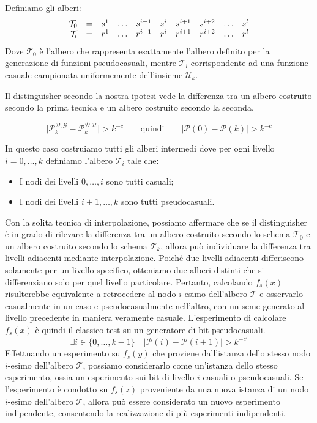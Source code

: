 Definiamo gli alberi:
\begin{align*}
  \begin{array}{r c lllllllll}
  \mathcal{T}_0 & = & s^1 &\dots &s^{i-1} & s^i &s^{i+1} & s^{i+2} &\dots &s^l \\
  \mathcal{T}_{l}& = & r^1 &\dots &r^{i-1} & r^i &r^{i+1} & r^{i+2} &\dots &r^l \\
  \end{array}
\end{align*}
Dove $\mathcal{T}_0$ è l'albero che rappresenta esattamente l'albero definito 
per la generazione di funzioni pseudocasuali, mentre $\mathcal{T}_l$ corrispondente ad una funzione 
casuale campionata uniformemente dell'insieme $\mathcal{U}_k$.

Il distinguisher secondo la nostra ipotesi vede la differenza tra un albero 
costruito secondo la prima tecnica e un albero costruito secondo la seconda.

\[
  \big|\mathcal{P}_k^{\mathcal{D}, \mathcal{G}} - \mathcal{P}_k^{\mathcal{D}, \mathcal{U}}\big| > k^{-c}
  \qquad\text{quindi}\qquad
  \big|\mathcal{P}(0) - \mathcal{P}(k)\big| > k^{-c}
\]

In questo caso costruiamo tutti gli alberi intermedi dove 
per ogni livello $i= 0, \dots, k$ definiamo l'albero $\mathcal{T}_i$ tale che:
\begin{itemize}
  \item I nodi dei livelli $0, \dots, i$ sono tutti casuali;
  \item I nodi dei livelli $i+1, \dots, k$ sono tutti pseudocasuali.
\end{itemize}
Con la solita tecnica di interpolazione, possiamo affermare che se il distinguisher è
in grado di rilevare la differenza tra un albero costruito secondo lo schema $\mathcal{T}_0$
e un albero costruito secondo lo schema $\mathcal{T}_k$, allora può individuare la differenza
tra livelli adiacenti mediante interpolazione. Poiché due livelli adiacenti differiscono solamente
per un livello specifico, otteniamo due alberi distinti che si differenziano solo per quel livello
particolare. Pertanto, calcolando $f_s(x)$ risulterebbe equivalente a retrocedere al nodo $i$-esimo
dell'albero $\mathcal{T}$ e osservarlo casualmente in un caso e pseudocasualmente nell'altro, con un
seme generato al livello precedente in maniera veramente casuale. L'esperimento di calcolare $f_s(x)$
è quindi il classico test su un generatore di bit pseudocasuali.
\[
  \exists i \in \{0, \dots, k-1\} \quad \big| \mathcal{P}(i) - \mathcal{P}(i+1) \big| > k^{-c'}
\]
Effettuando un esperimento su $f_s(y)$ che proviene dall'istanza dello stesso nodo $i$-esimo dell'albero
$\mathcal{T}$, possiamo considerarlo come un'istanza dello stesso esperimento, ossia un esperimento sui
bit di livello $i$ casuali o pseudocasuali. Se l'esperimento è condotto su $f_s(z)$ proveniente da una
nuova istanza di un nodo $i$-esimo dell'albero $\mathcal{T}$, allora può essere considerato un nuovo
esperimento indipendente, consentendo la realizzazione di più esperimenti indipendenti.

